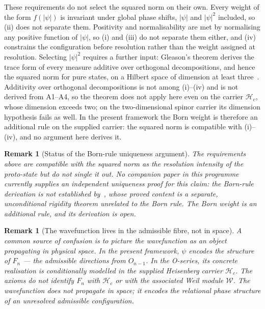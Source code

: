 \documentclass[11pt,a4paper]{article}
\newtheorem{remark}[theorem]{Remark}
\begin{document}
    These requirements do not select the squared norm on their own.
    Every weight of the form $f(|\psi|)$ is invariant under global phase shifts, $|\psi|$ and $|\psi|^2$
    included, so (ii) does not separate them.
    Positivity and normalisability are met by normalising any positive function of $|\psi|$, so (i) and (iii)
    do not separate them either, and (iv) constrains the configuration before resolution rather than the
    weight assigned at resolution.
    Selecting $|\psi|^2$ requires a further input: Gleason's theorem derives the trace form of every measure
    additive over orthogonal decompositions, and hence the squared norm for pure states, on a Hilbert space of
    dimension at least three~\cite{Gleason1957}.
    Additivity over orthogonal decompositions is not among (i)--(iv) and is not derived from A1--A4, so the
    theorem does not apply here even on the carrier $\mathcal{H}_c$, whose dimension exceeds two; on the
    two-dimensional spinor carrier its dimension hypothesis fails as well.
    In the present framework the Born weight is therefore an additional rule on the supplied carrier: the
    squared norm is compatible with (i)--(iv), and no argument here derives it.

    \begin{remark}[Status of the Born-rule uniqueness argument]
  The requirements above are compatible with the squared norm as the resolution intensity of the
  proto-state but do not single it out.
  No companion paper in this
  programme currently supplies an independent uniqueness proof for this
  claim: the Born-rule derivation is not established by~\cite{Beau2026q1},
  whose proved content is a separate, unconditional rigidity theorem
  unrelated to the Born rule.
  The Born weight is an additional rule, and its derivation is open.
    \end{remark}

    \begin{remark}[The wavefunction lives in the admissible fibre, not in space]
  A common source of confusion is to picture the wavefunction as an object
  propagating in physical space.
  In the present framework, $\psi$ encodes the structure of $F_n$ — the
  admissible directions from $O_{n-1}$.
  In the O-series, its concrete realisation is conditionally modelled in the
  supplied Heisenberg carrier $\mathcal{H}_c$.
  The axioms do not identify $F_n$ with $\mathcal{H}_c$ or with the associated
  Weil module $\mathcal{W}$.
  The wavefunction does not propagate in space; it encodes the relational
  phase structure of an unresolved admissible configuration.
    \end{remark}
\end{document}
